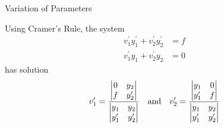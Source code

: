 \documentclass{beamer}
\begin{document}
\begin{frame}
\begin{block}{Variation of Parameters}
\begin{overprint}
Using Cramer's Rule, the system
\begin{equation*}
\begin{aligned}
v_1^\prime y_1^\prime + v_2^\prime y_2^\prime &=f\\
v_1^\prime y_1 + v_2^\prime y_2&=0
\end{aligned}
\end{equation*}
has solution
\begin{equation*}
v_1^\prime=\dfrac{%
\begin{vmatrix}
0 & y_2        \\
f & y_2^\prime \\
\end{vmatrix}}{%
\begin{vmatrix}
y_1        & y_2        \\
y_1^\prime & y_2^\prime \\
\end{vmatrix}}
\quad\text{and}\quad
v_2^\prime=\dfrac{%
\begin{vmatrix}
y_1        & 0 \\
y_1^\prime & f \\
\end{vmatrix}}{%
\begin{vmatrix}
y_1        & y_2        \\
y_1^\prime & y_2^\prime \\
\end{vmatrix}}
\end{equation*}


\end{overprint}
\end{block}
\end{frame}
\end{document}
